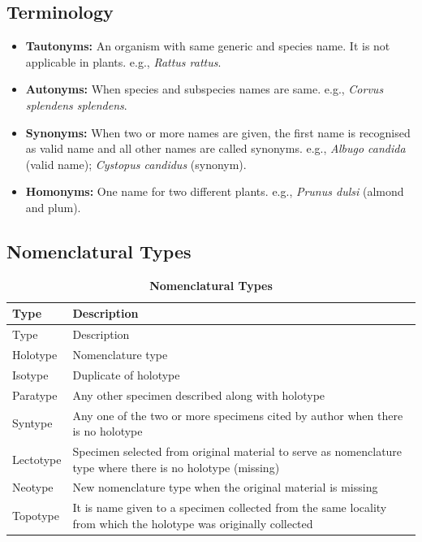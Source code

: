 \documentclass[
]{book}
\providecommand{\tightlist}{%
  \setlength{\itemsep}{0pt}\setlength{\parskip}{0pt}}
\begin{document}
\hypertarget{terminology}{%
\subsection{Terminology}\label{terminology}}

\begin{itemize}
\tightlist
\item
  \textbf{Tautonyms:} An organism with same generic and species name. It is not applicable in plants. e.g., \emph{Rattus rattus}.
\item
  \textbf{Autonyms:} When species and subspecies names are same. e.g., \emph{Corvus splendens splendens}.
\item
  \textbf{Synonyms:} When two or more names are given, the first name is recognised as valid name and all other names are called synonyms. e.g., \emph{Albugo candida} (valid name); \emph{Cystopus candidus} (synonym).
\item
  \textbf{Homonyms:} One name for two different plants. e.g., \emph{Prunus dulsi} (almond and plum).
\end{itemize}

\hypertarget{nomenclatural-types}{%
\subsection{Nomenclatural Types}\label{nomenclatural-types}}

\begin{longtable}[]{@{}
  >{\raggedright\arraybackslash}p{}
  >{\raggedright\arraybackslash}p{}@{}}
\caption{\textbf{\label{tab:t72} Nomenclatural Types}}\tabularnewline
\toprule
Type & Description \\
\midrule
\endfirsthead
\toprule
Type & Description \\
\midrule
\endhead
Holotype & Nomenclature type \\
Isotype & Duplicate of holotype \\
Paratype & Any other specimen described along with holotype \\
Syntype & Any one of the two or more specimens cited by author when there is no holotype \\
Lectotype & Specimen selected from original material to serve as nomenclature type where there is no holotype (missing) \\
Neotype & New nomenclature type when the original material is missing \\
Topotype & It is name given to a specimen collected from the same locality from which the holotype was originally collected \\
\bottomrule
\end{longtable}
\end{document}
